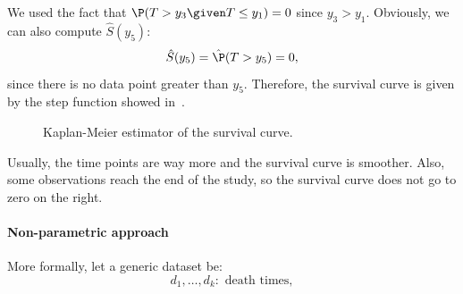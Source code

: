 We used the fact that $\P(T > y_3 \given T \leq y_1) = 0$ since $y_3 > y_1$.
Obviously, we can also compute $\hat{S}(y_5)$:
\begin{equation}
    \hat{S}(y_5) = \hat{\P}(T > y_5) = 0,
\end{equation}
since there is no data point greater than $y_5$. Therefore, the survival curve is given by the step function showed in~.
\begin{figure}
    \centering
    \caption{Kaplan-Meier estimator of the survival curve.}\label{fig:survival-curve}
\end{figure}

Usually, the time points are way more and the survival curve is smoother. Also, some observations reach the end of the study, so the survival curve does not go to zero on the right.

\paragraph{Non-parametric approach}

More formally, let a generic dataset be:
\begin{equation}
    d_1, \ldots, d_k\colon \text{ death times},
\end{equation}

